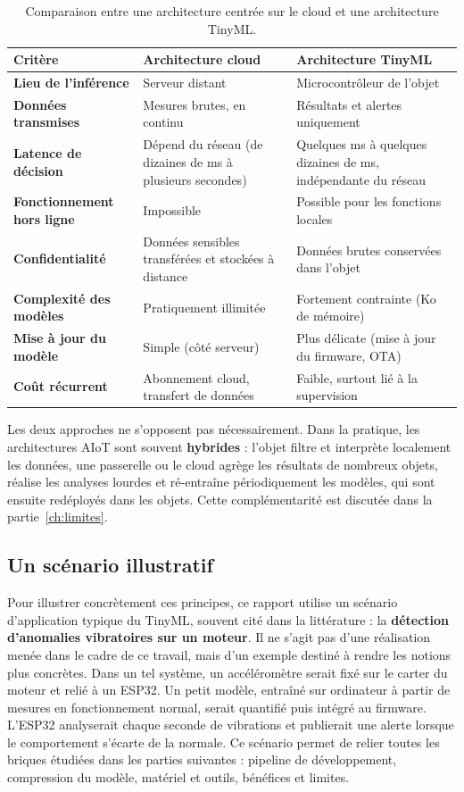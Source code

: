 \begin{table}[H]
\centering
\small
\begin{tabularx}{\linewidth}{>{\bfseries}l X X}
\toprule
Critère & Architecture cloud & Architecture TinyML \\
\midrule
Lieu de l'inférence      & Serveur distant & Microcontrôleur de l'objet \\
Données transmises       & Mesures brutes, en continu & Résultats et alertes uniquement \\
Latence de décision      & Dépend du réseau (de dizaines de ms à plusieurs secondes) & Quelques ms à quelques dizaines de ms, indépendante du réseau \\
Fonctionnement hors ligne & Impossible & Possible pour les fonctions locales \\
Confidentialité          & Données sensibles transférées et stockées à distance & Données brutes conservées dans l'objet \\
Complexité des modèles   & Pratiquement illimitée & Fortement contrainte (Ko de mémoire) \\
Mise à jour du modèle    & Simple (côté serveur) & Plus délicate (mise à jour du firmware, OTA) \\
Coût récurrent           & Abonnement cloud, transfert de données & Faible, surtout lié à la supervision \\
\bottomrule
\end{tabularx}
\caption{Comparaison entre une architecture centrée sur le cloud et une architecture TinyML.}
\label{tab:cloud-vs-tinyml}
\end{table}

Les deux approches ne s'opposent pas nécessairement. Dans la pratique, les
architectures AIoT sont souvent \textbf{hybrides} : l'objet filtre et
interprète localement les données, une passerelle ou le cloud agrège les
résultats de nombreux objets, réalise les analyses lourdes et ré-entraîne
périodiquement les modèles, qui sont ensuite redéployés dans les objets. Cette
complémentarité est discutée dans la partie~\ref{ch:limites}.

\subsection{Un scénario illustratif}

Pour illustrer concrètement ces principes, ce rapport utilise un scénario
d'application typique du TinyML, souvent cité dans la littérature : la
\textbf{détection d'anomalies vibratoires sur un moteur}. Il ne s'agit pas d'une
réalisation menée dans le cadre de ce travail, mais d'un exemple destiné à
rendre les notions plus concrètes. Dans un tel système, un accéléromètre serait
fixé sur le carter du moteur et relié à un ESP32. Un petit modèle, entraîné sur
ordinateur à partir de mesures en fonctionnement normal, serait quantifié puis
intégré au firmware. L'ESP32 analyserait chaque seconde de vibrations et
publierait une alerte lorsque le comportement s'écarte de la normale. Ce
scénario permet de relier toutes les briques étudiées dans les parties suivantes : pipeline de développement, compression du modèle,
matériel et outils, bénéfices et limites.
